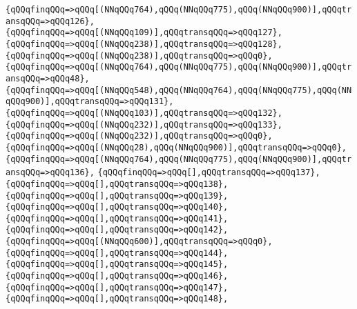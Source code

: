 \verb|{qQQqfinqQQq=>qQQq[(NNqQQq764),qQQq(NNqQQq775),qQQq(NNqQQq900)],qQQqtransqQQq=>qQQq126},|\newline
\verb|{qQQqfinqQQq=>qQQq[(NNqQQq109)],qQQqtransqQQq=>qQQq127},|\newline
\verb|{qQQqfinqQQq=>qQQq[(NNqQQq238)],qQQqtransqQQq=>qQQq128},|\newline
\verb|{qQQqfinqQQq=>qQQq[(NNqQQq238)],qQQqtransqQQq=>qQQq0},|\newline
\verb|{qQQqfinqQQq=>qQQq[(NNqQQq764),qQQq(NNqQQq775),qQQq(NNqQQq900)],qQQqtransqQQq=>qQQq48},|\newline
\verb|{qQQqfinqQQq=>qQQq[(NNqQQq548),qQQq(NNqQQq764),qQQq(NNqQQq775),qQQq(NNqQQq900)],qQQqtransqQQq=>qQQq131},|\newline
\verb|{qQQqfinqQQq=>qQQq[(NNqQQq103)],qQQqtransqQQq=>qQQq132},|\newline
\verb|{qQQqfinqQQq=>qQQq[(NNqQQq232)],qQQqtransqQQq=>qQQq133},|\newline
\verb|{qQQqfinqQQq=>qQQq[(NNqQQq232)],qQQqtransqQQq=>qQQq0},|\newline
\verb|{qQQqfinqQQq=>qQQq[(NNqQQq28),qQQq(NNqQQq900)],qQQqtransqQQq=>qQQq0},|\newline
\verb|{qQQqfinqQQq=>qQQq[(NNqQQq764),qQQq(NNqQQq775),qQQq(NNqQQq900)],qQQqtransqQQq=>qQQq136},|\newline
\verb|{qQQqfinqQQq=>qQQq[],qQQqtransqQQq=>qQQq137},|\newline
\verb|{qQQqfinqQQq=>qQQq[],qQQqtransqQQq=>qQQq138},|\newline
\verb|{qQQqfinqQQq=>qQQq[],qQQqtransqQQq=>qQQq139},|\newline
\verb|{qQQqfinqQQq=>qQQq[],qQQqtransqQQq=>qQQq140},|\newline
\verb|{qQQqfinqQQq=>qQQq[],qQQqtransqQQq=>qQQq141},|\newline
\verb|{qQQqfinqQQq=>qQQq[],qQQqtransqQQq=>qQQq142},|\newline
\verb|{qQQqfinqQQq=>qQQq[(NNqQQq600)],qQQqtransqQQq=>qQQq0},|\newline
\verb|{qQQqfinqQQq=>qQQq[],qQQqtransqQQq=>qQQq144},|\newline
\verb|{qQQqfinqQQq=>qQQq[],qQQqtransqQQq=>qQQq145},|\newline
\verb|{qQQqfinqQQq=>qQQq[],qQQqtransqQQq=>qQQq146},|\newline
\verb|{qQQqfinqQQq=>qQQq[],qQQqtransqQQq=>qQQq147},|\newline
\verb|{qQQqfinqQQq=>qQQq[],qQQqtransqQQq=>qQQq148},|\newline
